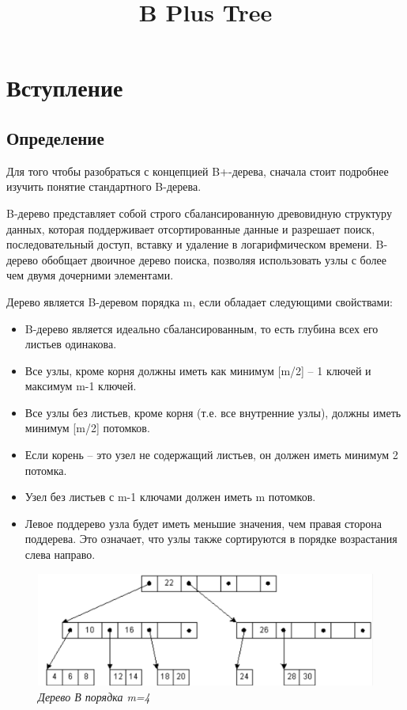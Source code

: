 \documentclass{article}
\title{B Plus Tree}
\begin{document}
\maketitle

\section{Вступление}
\subsection{Определение}
Для того чтобы разобраться с концепцией B+-дерева, сначала стоит подробнее изучить понятие стандартного B-дерева.

B-дерево представляет собой строго сбалансированную древовидную структуру данных, которая поддерживает отсортированные данные и разрешает поиск, последовательный доступ, вставку и удаление в логарифмическом времени. B-дерево обобщает двоичное дерево поиска, позволяя использовать узлы с более чем двумя дочерними элементами.  

Дерево является B-деревом порядка m, если обладает следующими свойствами:
\begin{itemize}
\item B-дерево является идеально сбалансированным, то есть глубина всех его листьев одинакова. 
\item Все узлы, кроме корня должны иметь как минимум [m/2] – 1 ключей и максимум m-1 ключей. 
\item Все узлы без листьев, кроме корня (т.е. все внутренние узлы), должны иметь минимум [m/2] потомков. 
\item Если корень – это узел не содержащий листьев, он должен иметь минимум 2 потомка. 
\item Узел без листьев с m-1 ключами должен иметь m потомков. 
\item Левое поддерево узла будет иметь меньшие значения, чем правая сторона поддерева. Это означает, что узлы также сортируются в порядке возрастания слева направо.
\end{itemize}

\begin{figure}
\includegraphics[scale=0.5]{1.png}
\caption{\textit{Дерево В порядка m=4}}
\end{figure}
\end{document}
